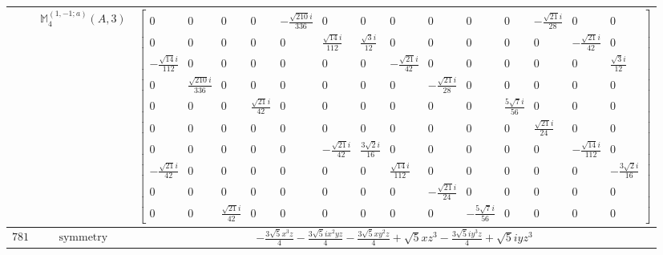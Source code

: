 \documentclass[fleqn,8pt,landscape]{jsarticle}
\begin{document}
\begin{longtable}{ccc}
$  $ & $ \mathbb{M}_{4}^{(1,-1;a)}(A,3) $ & $ \begin{bmatrix} 0 & 0 & 0 & 0 & - \frac{\sqrt{210} i}{336} & 0 & 0 & 0 & 0 & 0 & 0 & - \frac{\sqrt{21} i}{28} & 0 & 0 \\ 0 & 0 & 0 & 0 & 0 & \frac{\sqrt{14} i}{112} & \frac{\sqrt{3} i}{12} & 0 & 0 & 0 & 0 & 0 & - \frac{\sqrt{21} i}{42} & 0 \\ - \frac{\sqrt{14} i}{112} & 0 & 0 & 0 & 0 & 0 & 0 & - \frac{\sqrt{21} i}{42} & 0 & 0 & 0 & 0 & 0 & \frac{\sqrt{3} i}{12} \\ 0 & \frac{\sqrt{210} i}{336} & 0 & 0 & 0 & 0 & 0 & 0 & - \frac{\sqrt{21} i}{28} & 0 & 0 & 0 & 0 & 0 \\ 0 & 0 & 0 & \frac{\sqrt{21} i}{42} & 0 & 0 & 0 & 0 & 0 & 0 & \frac{5 \sqrt{7} i}{56} & 0 & 0 & 0 \\ 0 & 0 & 0 & 0 & 0 & 0 & 0 & 0 & 0 & 0 & 0 & \frac{\sqrt{21} i}{24} & 0 & 0 \\ 0 & 0 & 0 & 0 & 0 & - \frac{\sqrt{21} i}{42} & \frac{3 \sqrt{2} i}{16} & 0 & 0 & 0 & 0 & 0 & - \frac{\sqrt{14} i}{112} & 0 \\ - \frac{\sqrt{21} i}{42} & 0 & 0 & 0 & 0 & 0 & 0 & \frac{\sqrt{14} i}{112} & 0 & 0 & 0 & 0 & 0 & - \frac{3 \sqrt{2} i}{16} \\ 0 & 0 & 0 & 0 & 0 & 0 & 0 & 0 & - \frac{\sqrt{21} i}{24} & 0 & 0 & 0 & 0 & 0 \\ 0 & 0 & \frac{\sqrt{21} i}{42} & 0 & 0 & 0 & 0 & 0 & 0 & - \frac{5 \sqrt{7} i}{56} & 0 & 0 & 0 & 0 \end{bmatrix} $ \\ \hline
$ 781 $ & $ \text{symmetry} $ & $ - \frac{3 \sqrt{5} x^{3} z}{4} - \frac{3 \sqrt{5} i x^{2} y z}{4} - \frac{3 \sqrt{5} x y^{2} z}{4} + \sqrt{5} x z^{3} - \frac{3 \sqrt{5} i y^{3} z}{4} + \sqrt{5} i y z^{3} $ \\

\end{longtable}
\end{document}

